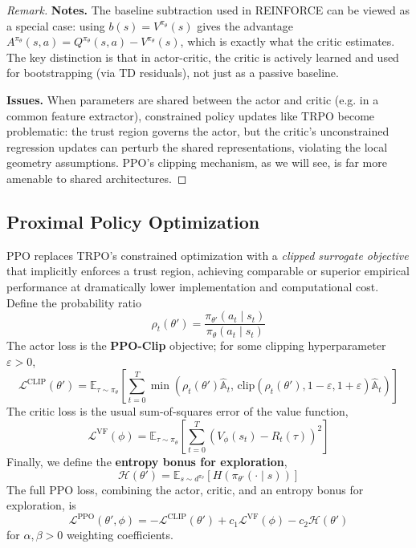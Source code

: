 \documentclass[11pt, letterpaper]{article}
\newenvironment{remark}
    {\renewcommand\qedsymbol{\(\blacksquare\)}\begin{proof}[Remark]}
    {\end{proof}}
\begin{document}
\begin{remark}
    \textbf{Notes.} The baseline subtraction used in REINFORCE can be viewed as a special case: using \(b(s) = V^{\pi_\theta}(s)\) gives the advantage \(A^{\pi_\theta}(s,a) = Q^{\pi_\theta}(s,a) - V^{\pi_\theta}(s)\), which is exactly what the critic estimates. The key distinction is that in actor-critic, the critic is actively learned and used for bootstrapping (via TD residuals), not just as a passive baseline. 
    
    \textbf{Issues.} When parameters are shared between the actor and critic (e.g. in a common feature extractor), constrained policy updates like TRPO become problematic: the trust region governs the actor, but the critic's unconstrained regression updates can perturb the shared representations, violating the local geometry assumptions. PPO's clipping mechanism, as we will see, is far more amenable to shared architectures. 
\end{remark}

\subsection{Proximal Policy Optimization}

\begin{concept}
    PPO replaces TRPO's constrained optimization with a \textit{clipped surrogate objective} that implicitly enforces a trust region, achieving comparable or superior empirical performance at dramatically lower implementation and computational cost. Define the probability ratio 
    \[
        \rho_t(\theta') = \frac{\pi_{\theta'}(a_t \mid s_t)}{\pi_\theta(a_t \mid s_t)}
    \]
    The actor loss is the \textbf{PPO-Clip} objective; for some clipping hyperparameter \(\varepsilon>0\), 
    \[
        \mathcal{L}^{\text{CLIP}}(\theta') = \mathbb{E}_{\tau \sim \pi_\theta} \left[ \sum_{t=0}^T \min\left( \rho_t(\theta') \widehat{\mathbb{A}}_t,\, \text{clip}(\rho_t(\theta'), 1-\varepsilon, 1+\varepsilon) \widehat{\mathbb{A}}_t \right) \right]
    \]
    The critic loss is the usual sum-of-squares error of the value function, 
    \[
        \mathcal{L}^{\text{VF}}(\phi) = \mathbb{E}_{\tau \sim \pi_\theta}\left[\sum_{t=0}^T (V_\phi(s_t) - R_t(\tau))^2\right]
    \]
    Finally, we define the \textbf{entropy bonus for exploration}, 
    \[
        \mathcal{H}(\theta') = \mathbb{E}_{s \sim d^{\pi_\theta}}[H(\pi_{\theta'}(\cdot \mid s))]
    \]
    The full PPO loss, combining the actor, critic, and an entropy bonus for exploration, is 
    \[
        \boxed{
            \mathcal{L}^{\text{PPO}}(\theta', \phi) 
            = -\mathcal{L}^{\text{CLIP}}(\theta') + c_1 \mathcal{L}^{\text{VF}}(\phi) - c_2 \mathcal{H}(\theta')
        }
    \]
    for \(\alpha, \beta > 0\) weighting coefficients. 
\end{concept}
\end{document}
